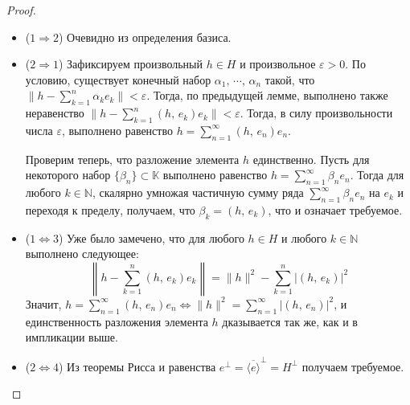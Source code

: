 \documentclass[a4paper,12pt]{article}
\theoremstyle{plain}
\theoremstyle{definition}
\theoremstyle{remark}
\begin{document}
\begin{proof}
	\begin{itemize}
		\item ($1 \Rightarrow 2$) Очевидно из определения базиса.
		\item ($2 \Rightarrow 1$) Зафиксируем произвольный $h \in H$ и произвольное $\varepsilon > 0$. По условию, существует конечный набор $\alpha_1,\,\cdots,\,\alpha_n$ такой, что $\|h - \sum_{k = 1}^n \alpha_ke_k\| < \varepsilon$. Тогда, по предыдущей лемме, выполнено также неравенство $\|h - \sum_{k = 1}^n (h,\,e_k)e_k\| < \varepsilon$. Тогда, в силу произвольности числа $\varepsilon$, выполнено равенство $h = \sum_{n = 1}^\infty (h,\, e_n)e_n$.

		      Проверим теперь, что разложение элемента $h$ единственно. Пусть для некоторого набор $\{\beta_n\} \subset \mathbb{K}$ выполнено равенство $h = \sum_{n = 1}^\infty \beta_ne_n$. Тогда для любого $k \in \mathbb{N}$, скалярно умножая частичную сумму ряда $\sum_{n = 1}^\infty \beta_ne_n$ на $e_k$ и переходя к пределу, получаем, что $\beta_k = (h,\,e_k)$, что и означает требуемое.
		\item ($1 \Leftrightarrow 3$) Уже было замечено, что для любого $h \in H$ и любого $k \in \mathbb{N}$ выполнено следующее:
		      \[
			      \left\|h - \sum_{k = 1}^n (h,\, e_k)e_k\right\| = \|h\|^2 - \sum_{k = 1}^n \vert(h,\, e_k)\vert^2
		      \]
		      Значит, $h = \sum_{n = 1}^\infty (h,\,e_n)e_n \Leftrightarrow \|h\|^2 = \sum_{n = 1}^\infty \vert (h,\, e_n)\vert^2$, и единственность разложения элемента $h$ дказывается так же, как и в импликации выше.

		\item ($2 \Leftrightarrow 4$) Из теоремы Рисса и равенства $e^\bot = \overline{\langle e\rangle}^\bot = H^\bot$ получаем требуемое.
	\end{itemize}
\end{proof}
\end{document}
